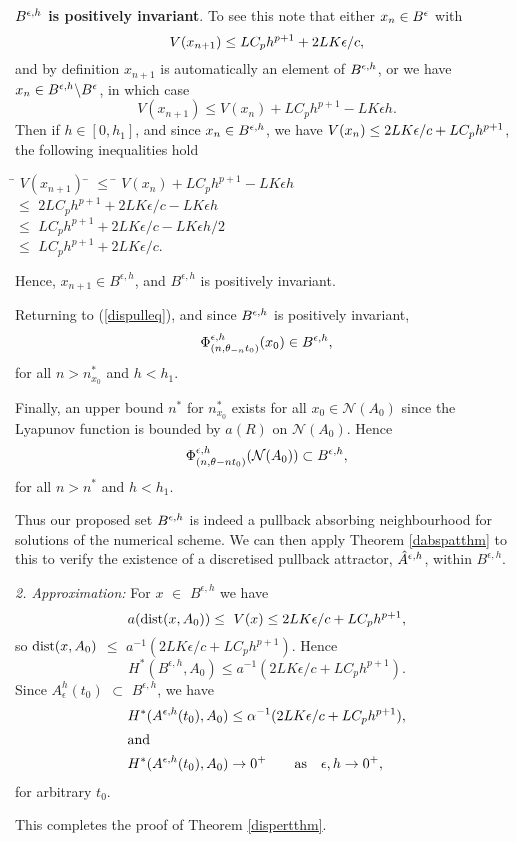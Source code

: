 \begin{prf}
  \textbf{$B^{\epsilon,h}$ is positively invariant}. To see this note that
  either   $x_{n} \in B^{\epsilon}$ with
  \[ V(x_{n+1}) \leq LC_{p}h^{p+1} +  2LK \epsilon /c, \]
  and by definition $x_{n+1}$ is automatically an element of $B^{\epsilon,h}$, or
  we have $x_n \in B^{\epsilon,h} \backslash B^{\epsilon}$, in which case
  \[ V(x_{n+1}) \leq V(x_{n}) + LC_{p}h^{p+1} - LK \epsilon h. \]
  Then if $h \in [0,h_{1}]$, and since $x_n \in B^{\epsilon, h}$, we have $V(x_n) \leq
  2LK\epsilon/c + LC_ph^{p+1}$, the following inequalities hold
  \begin{tabbing}
    \hspace{2cm} \= $V(x_{n+1})$ \= $\leq$ \= $V(x_{n}) + LC_{p}h^{p+1} -
                    LK \epsilon h$ \\
    \> \> $\leq$ \> $2LC_{p}h^{p+1} + 2LK\epsilon /c -
                    LK \epsilon h$ \\
    \> \> $\leq$ \> $LC_{p}h^{p+1} + 2LK\epsilon /c - LK
                    \epsilon h /2$ \\
    \> \> $\leq$ \> $LC_{p}h^{p+1} + 2LK\epsilon /c$. \\
  \end{tabbing}
  Hence, $x_{n+1} \in B^{\epsilon,h}$, and $B^{\epsilon,h}$ is positively
  invariant.

  Returning to (\ref{dispulleq}), and since $B^{\epsilon,h}$ is
  positively invariant,
  \[ \Phi^{\epsilon,h}_{(n,\theta_{-n}t_0)}(x_0) \in B^{\epsilon,h}, \]
  for all $n > n^*_{x_0}$ and $h < h_1$.

  Finally, an upper bound $n^*$ for $n^*_{x_0}$ exists for all $x_0 \in
  \mathcal{N}(A_0)$ since the Lyapunov function is bounded by $a(R)$ on
  $\mathcal{N}(A_0)$. Hence
  \[ \Phi^{\epsilon,h}_{(n,\theta{-n}t_0)}(\mathcal{N}(A_0)) \subset B^{\epsilon,h}, \]
  for all $n > n^*$ and $h < h_1$.

  Thus our proposed set $B^{\epsilon,h}$ is indeed a pullback absorbing
  neighbourhood for solutions of the numerical scheme. We can then apply
  Theorem \ref{dabspatthm} to this to verify the existence of a discretised
  pullback attractor, $\hat{A}^{\epsilon, h}$, within $B^{\epsilon,h}$.

  {\em 2. Approximation:}
  For $x$ $\in$ $B^{\epsilon,h}$ we have
  \[ a({\rm dist}(x,A_0)) \leq \ V(x) \leq 2LK \epsilon /c +
                                               LC_{p}h^{p+1}, \]
  so ${\rm dist}(x,A_0)$ $\leq$ $a^{-1}\left(2L K \epsilon /c +
  LC_{p}h^{p+1} \right)$. Hence
  \[ H^{*}(B^{\epsilon,h},A_0) \leq a^{-1}\left(2LK \epsilon /c +
                                       LC_{p}h^{p+1} \right). \]
  Since $A^h_{\epsilon}(t_0)$ $\subset$ $B^{\epsilon,h}$, we have
  \begin{align*}
    H^{*}(A^{\epsilon, h}(t_0), A_0) &\leq \alpha^{-1}(2L K \epsilon
            /c + LC_{p}h^{p+1}), \\
    \intertext{and}
    H^{*}(A^{\epsilon, h}(t_0), A_0) & \to 0^+ \qquad \text{as}  \quad
\epsilon,h             \to 0^+, \\
  \end{align*}
  for arbitrary $t_0$.

  This completes the proof of Theorem \ref{dispertthm}.

  \end{prf}

